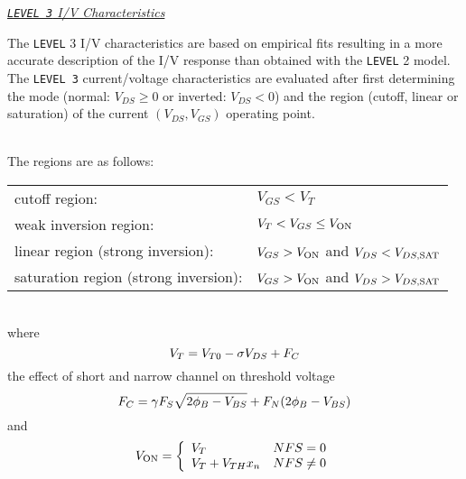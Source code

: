 \clearpage
\noindent\underline{\sl {\tt LEVEL 3} I/V Characteristics}

The {\tt LEVEL} 3 I/V characteristics are based on empirical fits resulting in a
more accurate description of the I/V response than obtained with the {\tt LEVEL}
2 model.
The {\tt LEVEL 3} current/voltage characteristics are evaluated after first
determining the mode (normal: $V_{DS} \ge 0$ or inverted:
$V_{DS} < 0$) and the region (cutoff,
linear or saturation) of the current
$(V_{DS}, V_{GS})$ operating point.

\\[0.2in]
The regions are as follows:\\[0.1in]
\begin{tabular}{ll}
cutoff region:&$V_{GS}<V_{T}$\\
weak inversion region:&$V_T < V_{GS} \le V_{\mbox{\scriptsize ON}}$ \\
linear region (strong inversion):&$V_{GS} > V_{\mbox{\scriptsize ON}}$
				  and $V_{DS} < V_{DS,\mbox{\scriptsize SAT}}$ \\
saturation region (strong inversion):&$V_{GS} > V_{\mbox{\scriptsize ON}}$
				  and $V_{DS} > V_{DS,\mbox{\scriptsize SAT}}$
\end{tabular}\\
where
\begin{equation}
V_T = V_{T0} - \sigma V_{DS} + F_C
\end{equation}
the effect of short and narrow channel on threshold voltage
\begin{equation}
F_C = \gamma F_S\sqrt{2\phi_B- V_{BS}}
         + F_N(2\phi_B - V_{BS})
\label{eqn:fc:level3}
\end{equation}
and
\begin{equation}
V_{\ms{ON}} = \left\{ \begin{array}{ll}
	 V_T             & NFS = 0\\
	 V_T + V_{TH}x_n & NFS \ne 0
	 \end{array} \right. %
\end{equation}

